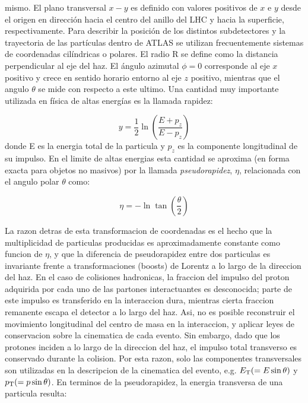 mismo. El plano transversal $x-y$ es definido con valores positivos de $x$ e $y$ desde el origen
en dirección hacia el centro del anillo del LHC y hacia la superficie, respectivamente.
Para describir la posición de los distintos subdetectores y la trayectoria de las partículas
dentro de ATLAS se utilizan frecuentemente sistemas de coordenadas cilíndricas o polares.
El radio R se define como la distancia perpendicular al eje del haz.  El ángulo azimutal
$\phi = 0$ corresponde al eje $x$ positivo y crece en sentido horario entorno al eje $z$ positivo,
mientras que el angulo $\theta$ se mide con respecto a este ultimo. Una cantidad muy importante
utilizada en física de altas energías es la llamada rapidez:

\begin{equation}
  y = \frac{1}{2} \ln \left( \frac{E+p_z}{E-p_z} \right)
\end{equation}
%
donde E es la energia total de la particula y $p_z$ es la componente longitudinal de su impulso.
En el limite de altas energias esta cantidad se aproxima (en forma exacta para objetos no masivos)
por la llamada \emph{pseudorapidez}, $\eta$, relacionada con el angulo polar $\theta$ como:

\begin{equation}
  \eta = - \ln \tan \left( \frac{\theta}{2} \right)
\end{equation}

La razon detras de esta transformacion de coordenadas es el hecho que la multiplicidad de particulas
producidas es aproximadamente constante como funcion de $\eta$, y que la
diferencia de pseudorapidez entre dos particulas es invariante frente a transformaciones
(boosts) de Lorentz a lo largo de la direccion del haz. En el caso de colisiones hadronicas,
la fraccion del impulso del proton adquirida por cada uno de las partones interactuantes
es desconocida; parte de este impulso es transferido en la interaccion dura, mientras cierta
fraccion remanente escapa el detector a lo largo del haz. Asi, no es posible reconstruir el
movimiento longitudinal del centro de masa en la interaccion, y aplicar leyes de conservacion
sobre la cinematica de cada evento. Sin embargo, dado que los protones inciden a lo
largo de la direccion del haz, el impulso total transverso es conservado durante la colision.
Por esta razon, solo las componentes transversales son utilizadas en la descripcion de la
cinematica del evento, e.g. $E_{\mathrm{T}} (= E \sin \theta)$ y $p_{\mathrm{T}} (= p \sin \theta)$.
En terminos de la pseudorapidez, la energia transversa de una particula resulta:


